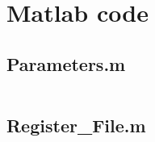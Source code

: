\chapter{Matlab code}

\section{Parameters.m}
\inputminted[linenos=true, 
bgcolor=bgcode,
frame=lines,
framesep=2mm,
baselinestretch=1.2,
fontsize=\footnotesize,
breaklines,
]{matlab}{Code/Parameters.m}

\section{Register\_File.m}
\inputminted[linenos=true, 
bgcolor=bgcode,
frame=lines,
framesep=2mm,
baselinestretch=1.2,
fontsize=\footnotesize,
breaklines,
]{matlab}{Code/Register_File.m}
